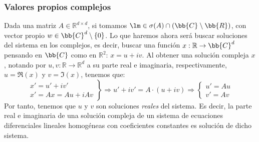 \subsubsection{Valores propios complejos}
Dada una matriz $A\in \mathbb{R}^{d\times d}$, si tomamos $\lm \in \sigma(A)\cap (\bb{C}\setminus\bb{R})$, con vector propio $w\in \bb{C}^d\setminus \{0\}$. Lo que haremos ahora será buscar soluciones del sistema en los complejos, es decir, buscar una función $x:\mathbb{R}\rightarrow\bb{C}^d$ pensando en $\bb{C}$ como en $\mathbb{R}^2$: $x = u + iv$. Al obtener una solución compleja $x$, notando por $u,v:\mathbb{R}\rightarrow\mathbb{R}^d$ a su parte real e imaginaria, respectivamente, $u=\Re(x)$ y $v=\Im(x)$, tenemos que:
\begin{equation*}
    \left.\begin{array}{r}
        x' = u' + iv' \\
        x' = Ax = Au + iAv
    \end{array}\right\} \Longrightarrow u' + iv' = A\cdot (u+iv)
    \Longrightarrow
    \left\{\begin{array}{r}
        u' = Au \\
        v' = Av
    \end{array}\right.
\end{equation*}
Por tanto, tenemos que $u$ y $v$ son soluciones \emph{reales} del sistema. Es decir, la parte real e imaginaria de una solución compleja de un sistema de ecuaciones diferenciales lineales homogéneas con coeficientes constantes es solución de dicho sistema.

